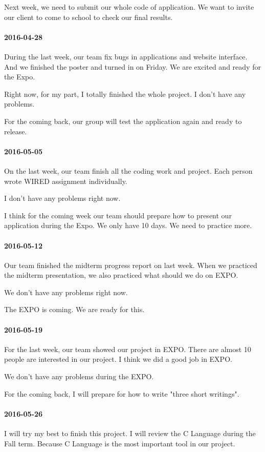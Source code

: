 Next week, we need to submit our whole code of application. We want to invite our client to come to school to check our final results.
\paragraph{2016-04-28}
During the last week, our team fix bugs in applications and website interface. And we finished the poster and turned in on Friday. We are excited and ready for the Expo.

Right now, for my part, I totally finished the whole project. I don't have any problems.

For the coming back, our group will test the application again and ready to release.
\paragraph{2016-05-05}
On the last week, our team finish all the coding work and project. Each person wrote WIRED assignment individually.

I don't have any problems right now.

I think for the coming week our team should prepare how to present our application during the Expo. We only have 10 days. We need to practice more.
\paragraph{2016-05-12}
Our team finished the midterm progress report on last week. When we practiced the midterm presentation, we also practiced what should we do on EXPO.

We don't have any problems right now.

The EXPO is coming. We are ready for this.
\paragraph{2016-05-19}
For the last week, our team showed our project in EXPO. There are almost 10 people are interested in our project. I think we did a good job in EXPO.

We don't have any problems during the EXPO.

For the coming back, I will prepare for how to write "three short writings".
\paragraph{2016-05-26}
I will try my best to finish this project. I will review the C Language during the Fall term. Because C Language is the most important tool in our project.

